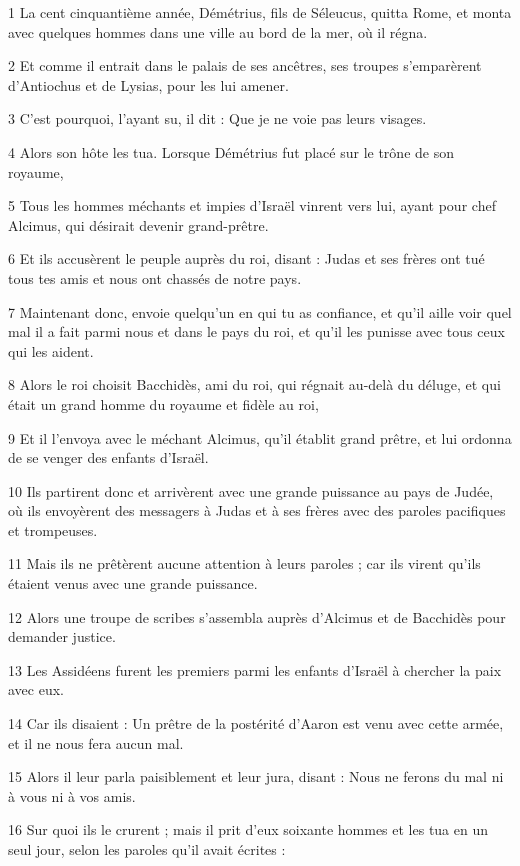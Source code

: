 \par 1 La cent cinquantième année, Démétrius, fils de Séleucus, quitta Rome, et monta avec quelques hommes dans une ville au bord de la mer, où il régna.
\par 2 Et comme il entrait dans le palais de ses ancêtres, ses troupes s'emparèrent d'Antiochus et de Lysias, pour les lui amener.
\par 3 C'est pourquoi, l'ayant su, il dit : Que je ne voie pas leurs visages.
\par 4 Alors son hôte les tua. Lorsque Démétrius fut placé sur le trône de son royaume,
\par 5 Tous les hommes méchants et impies d'Israël vinrent vers lui, ayant pour chef Alcimus, qui désirait devenir grand-prêtre.
\par 6 Et ils accusèrent le peuple auprès du roi, disant : Judas et ses frères ont tué tous tes amis et nous ont chassés de notre pays.
\par 7 Maintenant donc, envoie quelqu'un en qui tu as confiance, et qu'il aille voir quel mal il a fait parmi nous et dans le pays du roi, et qu'il les punisse avec tous ceux qui les aident.
\par 8 Alors le roi choisit Bacchidès, ami du roi, qui régnait au-delà du déluge, et qui était un grand homme du royaume et fidèle au roi,
\par 9 Et il l'envoya avec le méchant Alcimus, qu'il établit grand prêtre, et lui ordonna de se venger des enfants d'Israël.
\par 10 Ils partirent donc et arrivèrent avec une grande puissance au pays de Judée, où ils envoyèrent des messagers à Judas et à ses frères avec des paroles pacifiques et trompeuses.
\par 11 Mais ils ne prêtèrent aucune attention à leurs paroles ; car ils virent qu'ils étaient venus avec une grande puissance.
\par 12 Alors une troupe de scribes s'assembla auprès d'Alcimus et de Bacchidès pour demander justice.
\par 13 Les Assidéens furent les premiers parmi les enfants d'Israël à chercher la paix avec eux.
\par 14 Car ils disaient : Un prêtre de la postérité d'Aaron est venu avec cette armée, et il ne nous fera aucun mal.
\par 15 Alors il leur parla paisiblement et leur jura, disant : Nous ne ferons du mal ni à vous ni à vos amis.
\par 16 Sur quoi ils le crurent ; mais il prit d'eux soixante hommes et les tua en un seul jour, selon les paroles qu'il avait écrites :
